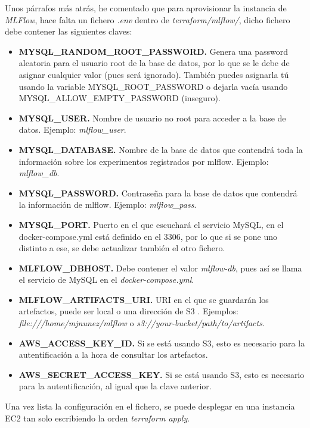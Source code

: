 Unos párrafos más atrás, he comentado que para aprovisionar la instancia de \textit{MLFlow}, hace falta un fichero \textit{.env} dentro de \textit{terraform/mlflow/}, dicho fichero debe contener las siguientes claves:

\begin{itemize}
	\item \textbf{MYSQL\_RANDOM\_ROOT\_PASSWORD.} Genera una password aleatoria para el usuario root de la base de datos, por lo que se le debe de asignar cualquier valor (pues será ignorado). También puedes asignarla tú usando la variable MYSQL\_ROOT\_PASSWORD o dejarla vacía usando MYSQL\_ALLOW\_EMPTY\_PASSWORD (inseguro).
	\item \textbf{MYSQL\_USER.} Nombre de usuario no root para acceder a la base de datos. Ejemplo: \textit{mlflow\_user}.
	\item \textbf{MYSQL\_DATABASE.} Nombre de la base de datos que contendrá toda la información sobre los experimentos registrados por mlflow. Ejemplo: \textit{mlflow\_db}.
	\item \textbf{MYSQL\_PASSWORD.} Contraseña para la base de datos que contendrá la información de mlflow. Ejemplo: \textit{mlflow\_pass}.
	\item \textbf{MYSQL\_PORT.} Puerto en el que escuchará el servicio MySQL, en el docker-compose.yml está definido en el 3306, por lo que si se pone uno distinto a ese, se debe actualizar también el otro fichero.
	\item \textbf{MLFLOW\_DBHOST.} Debe contener el valor \textit{mlflow-db}, pues así se llama el servicio de MySQL en el \textit{docker-compose.yml}.
	\item \textbf{MLFLOW\_ARTIFACTS\_URI.} URI en el que se guardarán los artefactos, puede ser local o una dirección de S3 \cite{mlflowtracking}. Ejemplos: \textit{file:///home/mjnunez/mlflow} o \textit{s3://your-bucket/path/to/artifacts}.
	\item \textbf{AWS\_ACCESS\_KEY\_ID.} Si se está usando S3, esto es necesario para la autentificación a la hora de consultar los artefactos.
	\item \textbf{AWS\_SECRET\_ACCESS\_KEY.} Si se está usando S3, esto es necesario para la autentificación, al igual que la clave anterior.
\end{itemize}

Una vez lista la configuración en el fichero, se puede desplegar en una instancia EC2 tan solo escribiendo la orden \textit{terraform apply}.\newline

